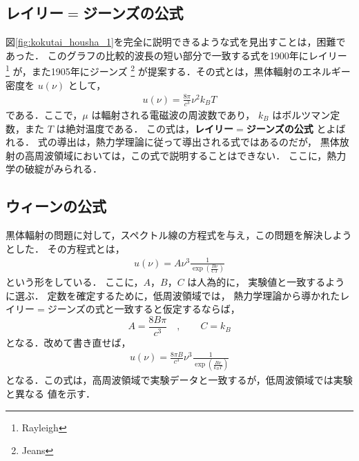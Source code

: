         \subsection{レイリー$=$ジーンズの公式}
            図\ref{fig:kokutai_housha_1}を完全に説明できるような式を見出すことは，困難であった．
            このグラフの比較的波長の短い部分で一致する式を1900年にレイリー
                \footnote{
                    Rayleigh
                }
            が，また1905年にジーンズ
                \footnote{
                    Jeans
                }
            が提案する．その式とは，黒体輻射のエネルギー密度を $u(\nu)$ として，
                \begin{align}
                    u(\nu)=\frac{8\pi}{c^{3}}\nu^{2}k_{B}T
                \end{align}
            である．ここで，$\mu$ は輻射される電磁波の周波数であり，
            $k_{B}$ はボルツマン定数，また $T$ は絶対温度である．
            この式は，\textbf{レイリー$=$ジーンズの公式} とよばれる．
            式の導出は，熱力学理論に従って導出される式ではあるのだが，
            黒体放射の高周波領域においては，この式で説明することはできない．
            ここに，熱力学の破綻がみられる．

        \subsection{ウィーンの公式}
            黒体輻射の問題に対して，スペクトル線の方程式を与え，この問題を解決しようとした．
            その方程式とは，
                \begin{align}
                    u(\nu) = A \nu^{3} \frac{1}{\exp\left({\frac{B \nu}{CT}}\right)}
                \end{align}
            という形をしている．
            ここに，$A$，$B$，$C$ は人為的に，
            実験値と一致するように選ぶ．
            定数を確定するために，低周波領域では，
            熱力学理論から導かれたレイリー$=$ジーンズの式と一致すると仮定するならば，
                \begin{equation*}
                    A = \frac{8B\pi}{c^{3}} \quad, \qquad C = {k}_{B}
                \end{equation*}
            となる．改めて書き直せば，
                \begin{align}
                    u(\nu) = \frac{8 \pi B}{c^{3}} \nu^{3} \frac{1}{\exp\left({\frac{B \nu}{{k}_{B}T}}\right)}
                \end{align}
            となる．この式は，高周波領域で実験データと一致するが，低周波領域では実験と異なる
            値を示す．

